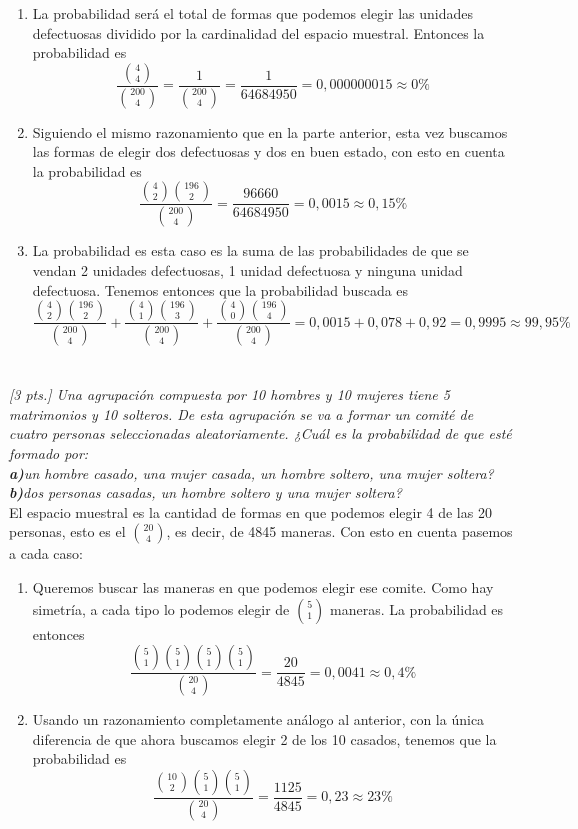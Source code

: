 \documentclass[11pt]{article}
\renewcommand{\(}{\left(}
\renewcommand{\)}{\right)}
\begin{document}
\begin{enumerate}
	\item La probabilidad será el total de formas que podemos elegir las unidades defectuosas dividido por la cardinalidad del espacio muestral. Entonces la probabilidad es $$\frac{\binom{4}{4}}{\binom{200}{4}} = \frac{1}{\binom{200}{4}} = \frac{1}{64684950} = 0,000000015 \approx 0\%$$
	\item Siguiendo el mismo razonamiento que en la parte anterior, esta vez buscamos las formas de elegir dos defectuosas y dos en buen estado, con esto en cuenta la probabilidad es $$\frac{\binom{4}{2}\binom{196}{2}}{\binom{200}{4}} = \frac{96660}{64684950} = 0,0015 \approx 0,15\%$$
	\item La probabilidad es esta caso es la suma de las probabilidades de que se vendan 2 unidades defectuosas, 1 unidad defectuosa y ninguna unidad defectuosa. Tenemos entonces que la probabilidad buscada es
	$$\frac{\binom{4}{2}\binom{196}{2}}{\binom{200}{4}} + \frac{\binom{4}{1}\binom{196}{3}}{\binom{200}{4}} + \frac{\binom{4}{0}\binom{196}{4}}{\binom{200}{4}} =  0,0015 + 0,078 + 0,92 = 0,9995 \approx 99,95\%$$
\end{enumerate}

\section{}

\textit{[3 pts.] Una agrupación compuesta por 10 hombres y 10 mujeres tiene 5 matrimonios y 10 solteros. De esta agrupación se va a formar un comité de cuatro personas seleccionadas aleatoriamente. ¿Cuál es la probabilidad de que esté formado por: \\ \textbf{a)}un hombre casado, una mujer casada, un hombre soltero, una mujer soltera? \textbf{b)}dos personas casadas, un hombre soltero y una mujer soltera?}\\

El espacio muestral es la cantidad de formas en que podemos elegir 4 de las 20 personas, esto es el $\binom{20}{4}$, es decir, de 4845 maneras. Con esto en cuenta pasemos a cada caso:

\begin{enumerate}
	\item Queremos buscar las maneras en que podemos elegir ese comite. Como hay simetría, a cada tipo lo podemos elegir de $\binom{5}{1}$ maneras. La probabilidad es entonces $$ \frac{\binom{5}{1}\binom{5}{1}\binom{5}{1}\binom{5}{1}}{\binom{20}{4}} = \frac{20}{4845} = 0,0041 \approx 0,4\%$$
	\item Usando un razonamiento completamente análogo al anterior, con la única diferencia de que ahora buscamos elegir 2 de los 10 casados, tenemos que la probabilidad es $$\frac{\binom{10}{2}\binom{5}{1}\binom{5}{1}}{\binom{20}{4}} = \frac{1125}{4845} = 0,23 \approx 23\%$$
\end{enumerate}
\end{document}

